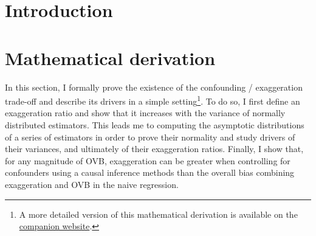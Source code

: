 \documentclass[usletter, 12pt]{article}
\begin{document}
	
	
	
	\newpage
	


	
	\section{Introduction}
	
		
	
	



	
	\section{Mathematical derivation} \label{maths}
						
		In this section, I formally prove the existence of the confounding / exaggeration trade-off  and describe its drivers in a simple setting\footnote{A more detailed version of this mathematical derivation is available on the \href{https://vincentbagilet.github.io/causal_exaggeration/Maths/math_causal_exaggeration.pdf}{companion website}.}. To do so, I first define an exaggeration ratio  and show that it increases with the variance of normally distributed estimators. This leads me to computing the asymptotic distributions of a series of estimators in order to prove their normality and study drivers of their variances, and ultimately of their exaggeration ratios. Finally, I show that, for any magnitude of OVB, exaggeration can be greater when controlling for confounders using a causal inference methods than the overall bias combining exaggeration and OVB in the naive regression.
		
\end{document}
